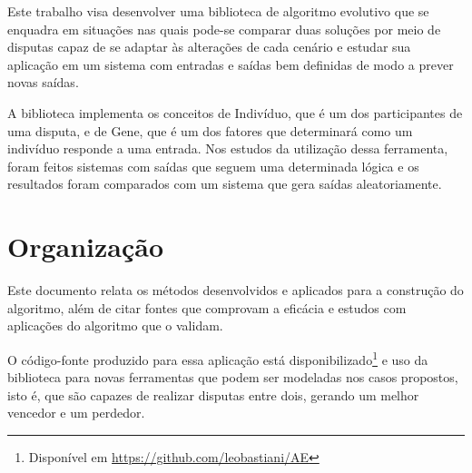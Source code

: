 Este trabalho visa desenvolver uma biblioteca de algoritmo evolutivo que se enquadra em situações nas quais pode-se comparar duas soluções por meio de disputas capaz de se adaptar às alterações de cada cenário e estudar sua aplicação em um sistema com entradas e saídas bem definidas de modo a prever novas saídas.

A biblioteca implementa os conceitos de Indivíduo, que é um dos participantes de uma disputa, e de Gene, que é um dos fatores que determinará como um indivíduo responde a uma entrada. Nos estudos da utilização dessa ferramenta, foram feitos sistemas com saídas que seguem uma determinada lógica e os resultados foram comparados com um sistema que gera saídas aleatoriamente.

\section{Organização}

Este documento relata os métodos desenvolvidos e aplicados para a construção do algoritmo, além de citar fontes que comprovam a eficácia e estudos com aplicações do algoritmo que o validam.

O código-fonte produzido para essa aplicação está disponibilizado\footnote{Disponível em \url{https://github.com/leobastiani/AE}} e uso da biblioteca para novas ferramentas que podem ser modeladas nos casos propostos, isto é, que são capazes de realizar disputas entre dois, gerando um melhor vencedor e um perdedor.
